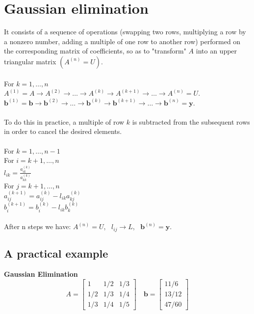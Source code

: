 \documentclass[11pt]{book}
\begin{document}
\section*{Gaussian elimination}
It consists of a sequence of operations (swapping two rows, multiplying a row by a nonzero number, adding a multiple of one row to another row) performed on the corresponding matrix of coefficients, so as to "transform" $A$ into an upper triangular matrix $\left(A^{(n)}=U\right)$.\\ \\ 
For $k=1, \ldots, n$ \\       
$A^{(1)}=A \rightarrow A^{(2)} \rightarrow \ldots \rightarrow A^{(k)} \rightarrow A^{(k+1)} \rightarrow \ldots \rightarrow A^{(n)}=U$.\\
$\boldsymbol{b}^{(1)}=\boldsymbol{b} \rightarrow \boldsymbol{b}^{(2)} \rightarrow \ldots \rightarrow \boldsymbol{b}^{(k)} \rightarrow \boldsymbol{b}^{(k+1)} \rightarrow \ldots \rightarrow \boldsymbol{b}^{(n)}=\boldsymbol{y}$. \\ \\
To do this in practice, a multiple of row $k$ is subtracted from the subsequent rows in order to cancel the desired elements. \\ \\
For $k=1, \ldots, n-1$\\
\hspace*{1em} For $i=k+1, \ldots, n$\\
\hspace*{2em} $l_{i k}=\frac{a_{i k}^{(k)}}{a_{k k}^{(k)}}$\\
\hspace*{2em} For $j=k+1, \ldots, n$\\
\hspace*{3em} $ a_{i j}^{(k+1)}=a_{i j}^{(k)}-l_{i k} a_{k j}^{(k)} $\\
\hspace*{2em} $b_i^{(k+1)}=b_i^{(k)}-l_{i k} b_k^{(k)}$\\ \\
After $\mathrm{n}$ steps we have:
$A^{(n)}=U$, \ $l_{i j} \rightarrow L$, \ $\boldsymbol{b}^{(n)}=\boldsymbol{y}$.
\subsection*{A practical example}
\textbf{Gaussian Elimination}
$$
A=\left[\begin{array}{ccc}
1 & 1 / 2 & 1 / 3 \\
1 / 2 & 1 / 3 & 1 / 4 \\
1 / 3 & 1 / 4 & 1 / 5
\end{array}\right] \quad \boldsymbol{b}=\left[\begin{array}{c}
11 / 6 \\
13 / 12 \\
47 / 60
\end{array}\right]
$$
\end{document}

